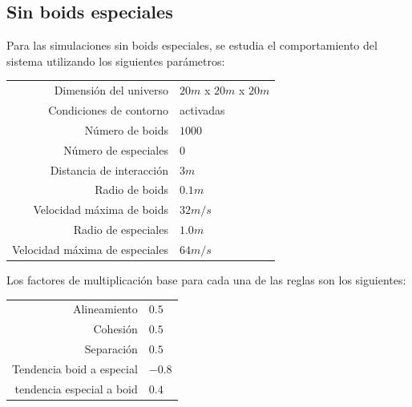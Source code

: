 \documentclass[a4paper]{article}
\begin{document}
        \subsection{Sin boids especiales}
            Para las simulaciones sin boids especiales, se estudia el comportamiento del sistema utilizando los siguientes parámetros:
                \begin{table}[h]
                    \centering
                    \begin{tabular}{|r|l|}
                        \hline
                        Dimensión del universo & $20m$ x $20m$ x $20m$ \\
                        Condiciones de contorno & activadas \\
                        Número de boids & $1000$ \\
                        Número de especiales & $0$ \\
                        Distancia de interacción & $3m$ \\
                        Radio de boids & $0.1m$ \\
                        Velocidad máxima de boids & $32 m/s$ \\
                        Radio de especiales & $1.0m$ \\
                        Velocidad máxima de especiales & $64 m/s$ \\
                        \hline
                    \end{tabular}
                \end{table}

            Los factores de multiplicación base para cada una de las reglas son los siguientes:

                \begin{table}[h]
                    \centering
                    \begin{tabular}{|r|l|}
                        \hline
                        Alineamiento & $0.5$ \\
                        Cohesión & $0.5$ \\
                        Separación & $0.5$ \\
                        Tendencia boid a especial & $-0.8$ \\
                        tendencia especial a boid & $0.4$ \\
                        \hline
                    \end{tabular}
                \end{table}
\end{document}
